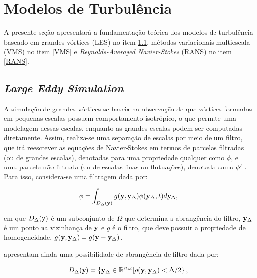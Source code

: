 \documentclass[_ArquivoPrincipal.tex]{subfiles}
\begin{document}
\section{Modelos de Turbulência} \label{MdT}

A presente seção apresentará a fundamentação teórica dos modelos de turbulência baseado em grandes vórtices (LES) no item \ref{LES}, métodos variacionais multiescala (VMS) no item \ref{VMS} e \textit{Reynolds-Averaged Navier-Stokes} (RANS) no item \ref{RANS}.

\subsection{\textit{Large Eddy Simulation}} \label{LES}

A simulação de grandes vórtices se baseia na observação de que vórtices formados em pequenas escalas possuem comportamento isotrópico, o que permite uma modelagem dessas escalas, enquanto as grandes escalas podem ser computadas diretamente. Assim, realiza-se uma separação de escalas por meio de um filtro, que irá reescrever as equações de Navier-Stokes em termos de parcelas filtradas (ou de grandes escalas), denotadas para uma propriedade qualquer como $\bar{\phi}$, e uma parcela não filtrada (ou de escalas finas ou flutuações), denotada como $\phi'$ \cite{germano1991dynamic,hughes2000large}. Para isso, considera-se uma filtragem dada por:

\begin{equation}
    \bar{\phi}=\int_{D_\Delta(\mathbf{y})}{g(\mathbf{y},\mathbf{y}_\Delta)\phi(\mathbf{y}_\Delta,t)d\mathbf{y}_\Delta}\text{,}
\end{equation}

\noindent em que $D_\Delta(\mathbf{y})$ é um subconjunto de $\Omega$ que determina a abrangência do filtro, $\mathbf{y}_\Delta$ é um ponto na vizinhança de $\mathbf{y}$ e $g$ é o filtro, que deve possuir a propriedade de homogeneidade, $g(\mathbf{y},\mathbf{y}_\Delta)=g(\mathbf{y}-\mathbf{y}_\Delta)$.

 apresentam ainda uma possibilidade de abrangência de filtro dada por:

\begin{equation}
    D_\Delta(\mathbf{y})=\left\{\mathbf{y}_\Delta\in\mathbb{R}^{n_{sd}}|\rho(\mathbf{y},\mathbf{y}_\Delta)<\Delta/2\right\}\text{,}
\end{equation}
\end{document}
